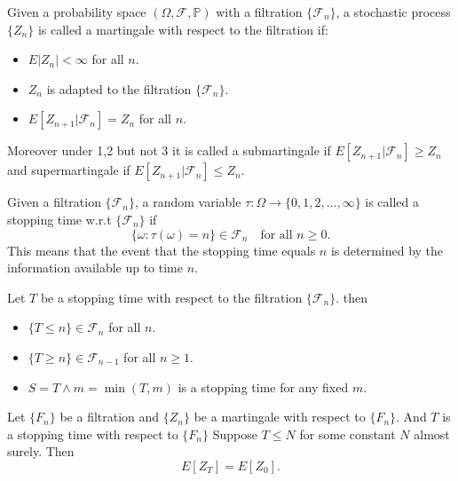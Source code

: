 \documentclass[answers,12pt,addpoints]{exam}
\begin{document}
\begin{definition}[Martingale]
    Given a probability space $(\Omega, \mathcal{F}, \mathbb{P})$ with a filtration $\{\mathcal{F}_n\}$, a stochastic process $\{Z_n\}$ is called a martingale with respect to the filtration if:
    \begin{itemize}
        \item $E|Z_n| < \infty$ for all $n$.
        \item $Z_n$ is adapted to the filtration $\{\mathcal{F}_n\}$.
        \item $E[Z_{n+1} | \mathcal{F}_n] = Z_n$ for all $n$.
    \end{itemize}
    Moreover under 1,2 but not 3 it is called a submartingale if $E[Z_{n+1} | \mathcal{F}_n] \geq Z_n$ and supermartingale if $E[Z_{n+1} | \mathcal{F}_n] \leq Z_n$.
\end{definition}

\begin{definition}
    Given a filtration $\{\mathcal{F}_n\}$, a random variable $\tau: \Omega \to \{0, 1, 2, \ldots, \infty\}$ is called a stopping time w.r.t $\{\mathcal{F}_n\}$ if
    $$
        \{\omega : \tau(\omega) = n\} \in \mathcal{F}_n \quad \text{for all } n \geq 0.
    $$
    This means that the event that the stopping time equals $n$ is determined by the information available up to time $n$.
\end{definition}

\begin{lemma}
    Let $T$ be a stopping time with respect to the filtration $\{\mathcal{F}_n\}$. then 
    \begin{itemize}
        \item $\{T \leq n\} \in \mathcal{F}_n$ for all $n$.
        \item $\{T \geq n\} \in \mathcal{F}_{n-1}$ for all $n \geq 1$.
        \item $S = T \wedge m = \min(T, m)$ is a stopping time for any fixed $m$.
    \end{itemize}
\end{lemma}

\begin{lemma}
    Let $\{F_n\}$ be a filtration and $\{Z_n\}$ be a martingale with respect to $\{F_n\}$. And $T$ is a stopping time with respect to $\{F_n\}$ Suppose $T \leq N$ for some constant $N$ almost surely. Then
    $$
        E[Z_T] = E[Z_0].
    $$
    
\end{lemma}
\end{document}
